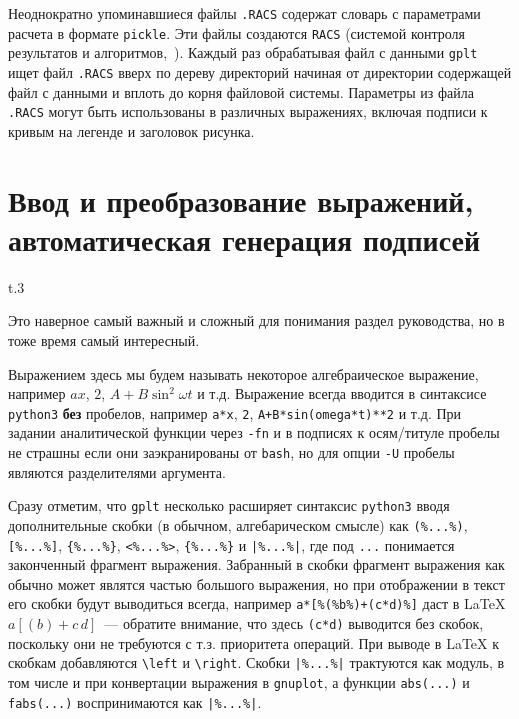 \documentclass[12pt]{article}
\def\gplt{{\tt gplt}}
\def\gnuplot{{\tt gnuplot}}
\def\python{{\tt python3}}
\begin{document}
Неоднократно упоминавшиеся файлы \verb'.RACS' содержат словарь с параметрами расчета в формате \verb'pickle'.
Эти файлы создаются \verb'RACS' (системой контроля результатов и алгоритмов,~\cite{aiwlib:SR:PP2018}).
Каждый раз обрабатывая файл с данными \gplt{} ищет файл \verb'.RACS' вверх по дереву директорий начиная от директории содержащей файл с данными
и вплоть до корня файловой системы. Параметры из файла \verb'.RACS' могут быть использованы в различных выражениях, включая подписи к кривым на легенде и
заголовок рисунка. 

\section{Ввод и преобразование выражений, автоматическая генерация подписей}
\begin{wrapfigure}[8]{t}{.3\textwidth}
  \vphantom{.}
  \vspace{-1cm}

\end{wrapfigure}
Это наверное самый важный и сложный для понимания раздел руководства, но в тоже время самый интересный. 

Выражением здесь мы будем называть некоторое алгебраическое выражение, например $a x$, $2$, $A + B\sin^2\omega t$ и т.д. Выражение всегда вводится
в синтаксисе \python{} {\bf без} пробелов, например \verb'a*x', \verb'2', \verb'A+B*sin(omega*t)**2' и т.д.
При задании аналитической функции через {\tt -fn} и в подписях к осям/титуле пробелы не страшны если они
  заэкранированы от {\tt bash}, но для опции {\tt -U} пробелы являются разделителями аргумента. 

Сразу отметим, что \gplt{} несколько расширяет синтаксис \python{} вводя дополнительные скобки (в обычном, алгебарическом смысле) как
\verb'(%...%)', \verb'[%...%]', \verb'{%...%}', \verb'<%...%>', \verb'{%...%}' и \verb'|%...%|', где под \verb'...' понимается законченный фрагмент выражения.
Забранный в скобки фрагмент выражения как обычно может являтся частью большого выражения, но при отображении в текст его скобки будут выводиться всегда, например
\verb'a*[%(%b%)+(c*d)%]' даст в \LaTeX\linebreak $a[(b)+c\,d]$~--- обратите внимание, что здесь \verb'(c*d)' выводится без скобок, поскольку они не требуются
с т.з. приоритета операций. При выводе в \LaTeX{} к скобкам добавляются \verb'\left' и \verb'\right'. Скобки \verb'|%...%|' трактуются как модуль,
в том числе и при конвертации выражения в \gnuplot{}, а функции \verb'abs(...)' и \verb'fabs(...)' воспринимаются как \verb'|%...%|'.
\end{document}
